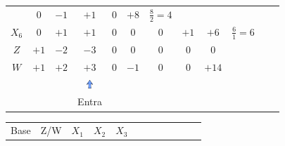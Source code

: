 \documentclass{beamer}
\begin{document}
\begin{frame}
{\begin{table}
\begin{tabular}{c c c c c c c c c c c c}
				& \cellcolor{yellow!50} $\scriptstyle 0$			
				& \cellcolor{yellow!50} $\scriptstyle -1$
				& \cellcolor{yellow!50} $\scriptstyle +1$
				& \cellcolor{yellow!50} $\scriptstyle 0$ 
				& \cellcolor{gray!50} $\scriptstyle +8$ 
				& $ \scriptstyle \frac{8}{2} = 4$ \\
				\cellcolor{blue!100} \color{red} $\scriptstyle X_6$
				& \cellcolor{yellow!50} $\scriptstyle 0$
				& \cellcolor{yellow!50} $\scriptstyle +1$
				& \cellcolor{gray!50} $\scriptstyle +1$
				& \cellcolor{yellow!50} $\scriptstyle 0$
				& \cellcolor{yellow!50} $\scriptstyle 0$
				& \cellcolor{yellow!50} $\scriptstyle 0$
				& \cellcolor{yellow!50} $\scriptstyle +1$
				& \cellcolor{gray!50} $\scriptstyle +6$
				& $ \scriptstyle \frac{6}{1} = 6$ \\
				\cellcolor{blue!100} \color{white} $\scriptstyle Z$
				& \cellcolor{yellow!50} $\scriptstyle +1$
				& \cellcolor{yellow!50} $\scriptstyle -2$
				& \cellcolor{gray!50} $\scriptstyle -3$
				& \cellcolor{yellow!50} $\scriptstyle 0$
				& \cellcolor{yellow!50} $\scriptstyle 0$
				& \cellcolor{yellow!50} $\scriptstyle 0$
				& \cellcolor{yellow!50} $\scriptstyle 0$ 
				& \cellcolor{gray!50} $\scriptstyle 0$  \\
				\cellcolor{blue!100} \color{white} $\scriptstyle W$
				& \cellcolor{yellow!90} $\scriptstyle +1$
				& \cellcolor{yellow!90} $\scriptstyle +2$
				& \cellcolor{gray!50} $\scriptstyle +3$
				& \cellcolor{yellow!90} $\scriptstyle 0$
				& \cellcolor{yellow!90} $\scriptstyle -1$
				& \cellcolor{yellow!90} $\scriptstyle 0$
				& \cellcolor{yellow!90} $\scriptstyle 0$ 
				& \cellcolor{gray!50} $\scriptstyle +14$  \\
				& & &  \includegraphics[width=0.3cm,height=0.3cm]{setacima.jpg} \\
				& & &  \scriptsize Entra \\
			\end{tabular}
		\end{table}			
	}
	{
		\begin{table}		
			\begin{tabular}{c c c c c c c c c c c c}
				\cline{1-8} 
				\cellcolor{blue!100} \color{white} \scriptsize Base 
				&\cellcolor{blue!100} \color{white} \scriptsize Z/W
				&\cellcolor{blue!100} \color{white} $\scriptstyle X_1$ 
				&\cellcolor{blue!100} \color{red} $\scriptstyle X_2$ 
				&\cellcolor{blue!100} \color{white}   $\scriptstyle X_3$ 

\end{tabular}
\end{table}}
\end{frame}
\end{document}
